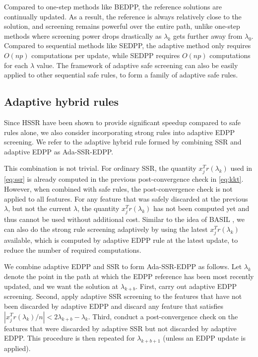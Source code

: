Compared to one-step methods like BEDPP, the reference solutions are continually updated.  As a result, the reference is always relatively close to the solution, and screening remains powerful over the entire path, unlike one-step methods where screening power drops drastically as $\lambda_k$ gets further away from $\lambda_0$. Compared to sequential methods like SEDPP, the adaptive method only requires $O(np)$ computations per update, while SEDPP requires $O(np)$ computations for each $\lambda$ value. The framework of adaptive safe screening can also be easily applied to other sequential safe rules, to form a family of adaptive safe rules.

\subsection{Adaptive hybrid rules}

Since HSSR \citep{Zeng2021} have been shown to provide significant speedup compared to safe rules alone, we also consider incorporating strong rules into adaptive EDPP screening. We refer to the adaptive hybrid rule formed by combining SSR and adaptive EDPP as Ada-SSR-EDPP.

This combination is not trivial. For ordinary SSR, the quantity $x_j^Tr(\lambda_k)$ used in \eqref{eq:ssr} is already computed in the previous post-convergence check in \eqref{eq:kkt}. However, when combined with safe rules, the post-convergence check is not applied to all features. For any feature that was safely discarded at the previous $\lambda$, but not the current $\lambda$, the quantity $x_j^Tr(\lambda_k)$ has not been computed yet and thus cannot be used without additional cost. Similar to the idea of BASIL \citep{qian2019fast}, we can also do the strong rule screening adaptively by using the latest $x_j^Tr(\lambda_k)$ available, which is computed by adaptive EDPP rule at the latest update, to reduce the number of required computations.

We combine adaptive EDPP and SSR to form Ada-SSR-EDPP as follows. Let $\lambda_k$ denote the point in the path at which the EDPP reference has been most recently updated, and
we want the solution at $\lambda_{k+b}$. First, carry out adaptive EDPP screening. Second, apply adaptive SSR screening to the features that have not been discarded by adaptive EDPP and discard any feature that satisfies $|x_j^Tr(\lambda_k)/n|<2\lambda_{k+b}-\lambda_k$. Third, conduct a post-convergence check on the features that were discarded by adaptive SSR but not discarded by adaptive EDPP. This procedure is then repeated for $\lambda_{k+b+1}$ (unless an EDPP update is applied).

